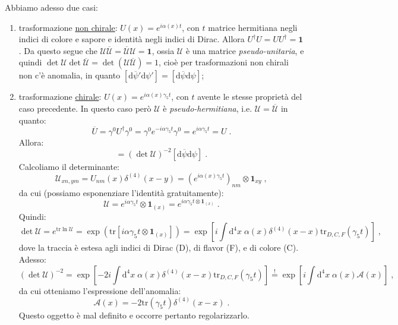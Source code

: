 \documentclass[12pt,a4paper]{article}
\theoremstyle{definition}
\newcommand{\diff}[1][]{\mathrm{d}#1}
\newcommand{\adj}[1]{#1^{\dagger}}
\newcommand{\tr}{\mathrm{tr}}
\numberwithin{equation}{section}
\begin{document}
Abbiamo adesso due casi:
\begin{enumerate}
\item trasformazione \underline{non chirale}: $U(x)=e^{i\alpha(x)t}$, con $t$ matrice hermitiana negli indici di colore e sapore e identità negli indici di Dirac. Allora $\adj{U}U=U\adj{U}=\mathbf{1}$. Da questo segue che $\mathcal{U}\overline{\mathcal{U}}=\overline{\mathcal{U}}\mathcal{U}=\mathbf{1}$, ossia $\mathcal{U}$ è una matrice \emph{pseudo-unitaria}, e quindi $\det\mathcal{U}\det\overline{\mathcal{U}}=\det(\mathcal{U}\overline{\mathcal{U}})=1$, cioè per trasformazioni non chirali non c'è anomalia, in quanto $[\diff{\overline{\psi}'}\diff{\psi'}]=[\diff{\overline{\psi}}\diff{\psi}]$;
\item trasformazione \underline{chirale}: $U(x)=e^{i\alpha(x)\gamma_5t}$, con $t$ avente le stesse proprietà del caso precedente. In questo caso però $\mathcal{U}$ è \emph{pseudo-hermitiana}, i.e. $\mathcal{U}=\overline{\mathcal{U}}$ in quanto:
$$
\overline{U}=\gamma^0\adj{U}\gamma^0=\gamma^0e^{-i\alpha\gamma_5t}\gamma^0=e^{i\alpha\gamma_5t}=U\;.
$$
Allora:
\begin{equation}
[\diff{\overline{\psi}'}\diff{\psi'}]=(\det\mathcal{U})^{-2}[\diff{\overline{\psi}}\diff{\psi}]\;.
\end{equation}
Calcoliamo il determinante:
$$
\mathcal{U}_{xn,ym}=U_{nm}(x)\delta^{(4)}(x-y)=\left(e^{i\alpha(x)\gamma_5t}\right)_{nm}\otimes\mathbf{1}_{xy}\;,
$$
da cui (possiamo esponenziare l'identità gratuitamente):
$$
\mathcal{U}=e^{i\alpha\gamma_5t}\otimes \mathbf{1}_{(x)}=e^{i\alpha\gamma_5t\otimes\mathbf{1}_{(x)}}\;.
$$
Quindi:
\begin{equation}
\det\mathcal{U}=e^{\tr\ln\mathcal{U}}=\exp\left(\tr[i\alpha\gamma_5t\otimes\mathbf{1}_{(x)}]\right)=\exp\left[i\int\diff^4{x}\;\alpha(x)\delta^{(4)}(x-x)\tr_{D,C,F}(\gamma_5t)\right]\;,
\end{equation}
dove la traccia è estesa agli indici di Dirac (D), di flavor (F), e di colore (C). Adesso:
$$
(\det\mathcal{U})^{-2}=\exp\left[-2i\int\diff^4{x}\;\alpha(x)\delta^{(4)}(x-x)\tr_{D,C,F}(\gamma_5t)\right]\stackrel{!}{=}\exp\left[i\int\diff^4{x}\;\alpha(x)\mathcal{A}(x)\right]\;,
$$
da cui otteniamo l'espressione dell'anomalia:
\begin{equation}
\boxed{
\mathcal{A}(x)=-2\tr(\gamma_5t)\delta^{(4)}(x-x)
}\;.
\end{equation}
Questo oggetto è mal definito e occorre pertanto regolarizzarlo.
\end{enumerate}
\end{document}
